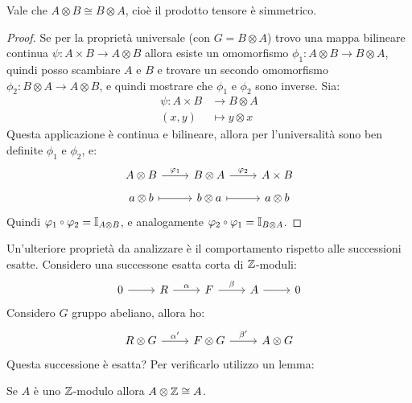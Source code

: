 \begin{proposition}
  Vale che $ A \otimes B \cong B \otimes A $, cioè il prodotto tensore è simmetrico.
\end{proposition}
\begin{proof}
  Se per la proprietà universale (con $ G = B \otimes A $) trovo una mappa bilineare continua
  $ \psi \colon A \times B \to A \otimes B $ allora esiste un omomorfismo
  $ \phi_1 \colon A \otimes B \to B \otimes A $, quindi posso scambiare $ A $ e
  $ B $ e trovare un secondo omomorfismo
  $ \phi_2 \colon B \otimes A \to A \otimes B $, e quindi mostrare che $ \phi_1 $ e $ \phi_2 $ sono inverse.
  Sia:
  \begin{align*}
    \psi \colon A \times B & \to B \otimes A \\
    (x,y) & \mapsto y \otimes x
  \end{align*}
  Questa applicazione è continua e bilineare, allora per l'universalità sono ben
  definite $ \phi_1 $ e $ \phi_2 $, e:
  \[
    \begin{tikzcd}[nodes = {row sep=5pt}]
      A \otimes B \rar{\phi_1} & B \otimes A \rar{\phi_2} & A \times B \\
      a \otimes b \arrow[mapsto]{r} & b \otimes a \arrow[mapsto]{r} & a \otimes b
    \end{tikzcd}
  \]
  Quindi $ \phi_1 \circ \phi_2 = \Id{A \otimes B} $, e analogamente  $ \phi_2 \circ \phi_1 = \Id{B \otimes A} $.
\end{proof}
\eproof
Un'ulteriore proprietà da analizzare è il comportamento rispetto alle successioni
esatte. Considero una successone esatta corta di $ \mathbb{Z} $-moduli:
\[
  \begin{tikzcd}
    0 \rar{} & R \rar{\alpha} & F \rar{\beta} & A \rar & 0
  \end{tikzcd}
\]
Considero $ G $ gruppo abeliano, allora ho:
\[
  \begin{tikzcd}
    R \otimes G \rar{\alpha'} & F \otimes G \rar{\beta'} & A \otimes G
  \end{tikzcd}
\]
Questa successione è esatta? Per verificarlo utilizzo un lemma:
\begin{lemma}
  Se $ A $ è uno $ \mathbb{Z} $-modulo allora $ A \otimes \mathbb{Z} \cong A $.
\end{lemma}
